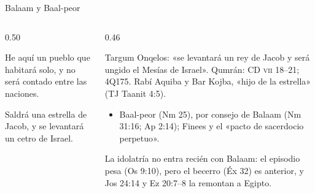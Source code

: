 \begin{frame}{Balaam y Baal-peor}
\begin{columns}[T,onlytextwidth]
\begin{column}{0.50\textwidth}
\par\smallskip
\begin{cita}He aquí un pueblo que habitará solo, y no será contado entre las naciones.\end{cita}
\par\smallskip
\begin{cita}Saldrá una estrella de Jacob, y se levantará un cetro de Israel.\end{cita}
\end{column}
\begin{column}{0.46\textwidth}\scriptsize\RaggedRight
\begin{notalam}
Targum Onqelos: «se levantará un rey de Jacob y será ungido el Mesías de Israel». Qumrán: CD \textsc{vii} 18--21; 4Q175. Rabí Aquiba y Bar Kojba, «hijo de la estrella» (TJ Taanit 4:5).
\end{notalam}
\begin{itemize}
\item Baal-peor (Nm 25), por consejo de Balaam (Nm 31:16; Ap 2:14); Finees y el «pacto de sacerdocio perpetuo».
\end{itemize}
\begin{clave}La idolatría no entra recién con Balaam: el episodio pesa (Os 9:10), pero el becerro (Éx 32) es anterior, y Jos 24:14 y Ez 20:7--8 la remontan a Egipto.\end{clave}
\end{column}
\end{columns}
\end{frame}

